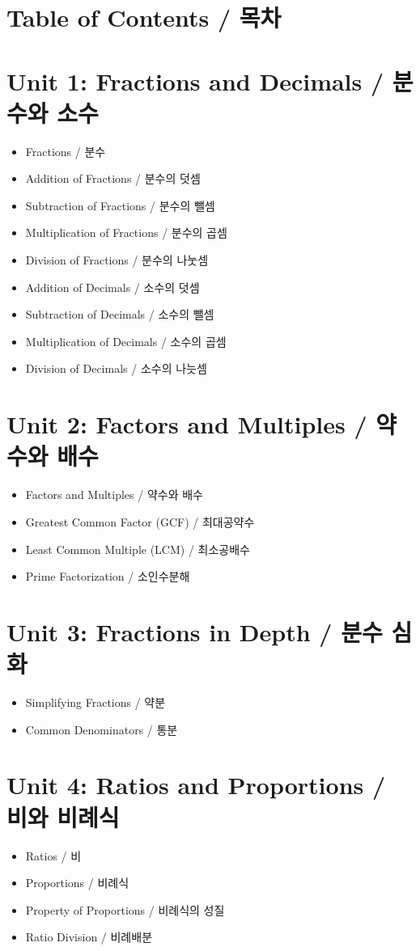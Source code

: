\documentclass[10pt]{article}
\begin{document}
\section*{Table of Contents / 목차}
\section*{Unit 1: Fractions and Decimals / 분수와 소수}
\begin{itemize}
  \item Fractions / 분수
  \item Addition of Fractions / 분수의 덧셈
  \item Subtraction of Fractions / 분수의 뺄셈
  \item Multiplication of Fractions / 분수의 곱셈
  \item Division of Fractions / 분수의 나눗셈
  \item Addition of Decimals / 소수의 덧셈
  \item Subtraction of Decimals / 소수의 뺄셈
  \item Multiplication of Decimals / 소수의 곱셈
  \item Division of Decimals / 소수의 나늣셈
\end{itemize}

\section*{Unit 2: Factors and Multiples / 약수와 배수}
\begin{itemize}
  \item Factors and Multiples / 약수와 배수
  \item Greatest Common Factor (GCF) / 최대공약수
  \item Least Common Multiple (LCM) / 최소공배수
  \item Prime Factorization / 소인수분해
\end{itemize}

\section*{Unit 3: Fractions in Depth / 분수 심화}
\begin{itemize}
  \item Simplifying Fractions / 약분
  \item Common Denominators / 통분
\end{itemize}

\section*{Unit 4: Ratios and Proportions / 비와 비례식}
\begin{itemize}
  \item Ratios / 비
  \item Proportions / 비례식
  \item Property of Proportions / 비례식의 성질
  \item Ratio Division / 비례배분
\end{itemize}
\end{document}
